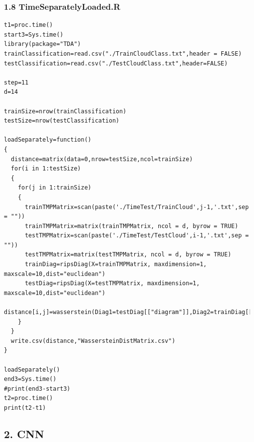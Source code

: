 \documentclass[12pt]{ctexart}
\begin{document}
\subsubsection*{1.8 TimeSeparatelyLoaded.R}
\begin{scriptsize}
\begin{verbatim}
t1=proc.time()
start3=Sys.time()
library(package="TDA")
trainClassification=read.csv("./TrainCloudClass.txt",header = FALSE)
testClassification=read.csv("./TestCloudClass.txt",header=FALSE)

step=11
d=14

trainSize=nrow(trainClassification)
testSize=nrow(testClassification)

loadSeparately=function()
{
  distance=matrix(data=0,nrow=testSize,ncol=trainSize)
  for(i in 1:testSize)
  {
    for(j in 1:trainSize)
    {
      trainTMPMatrix=scan(paste('./TimeTest/TrainCloud',j-1,'.txt',sep = ""))
      trainTMPMatrix=matrix(trainTMPMatrix, ncol = d, byrow = TRUE)
      testTMPMatrix=scan(paste('./TimeTest/TestCloud',i-1,'.txt',sep = ""))
      testTMPMatrix=matrix(testTMPMatrix, ncol = d, byrow = TRUE)
      trainDiag=ripsDiag(X=trainTMPMatrix, maxdimension=1, maxscale=10,dist="euclidean")
      testDiag=ripsDiag(X=testTMPMatrix, maxdimension=1, maxscale=10,dist="euclidean")
      distance[i,j]=wasserstein(Diag1=testDiag[["diagram"]],Diag2=trainDiag[["diagram"]],dimension=0)
    }
  }
  write.csv(distance,"WassersteinDistMatrix.csv")
}

loadSeparately()
end3=Sys.time()
#print(end3-start3)
t2=proc.time()
print(t2-t1)
\end{verbatim}
\end{scriptsize}

\subsection*{2. CNN}
\end{document}
